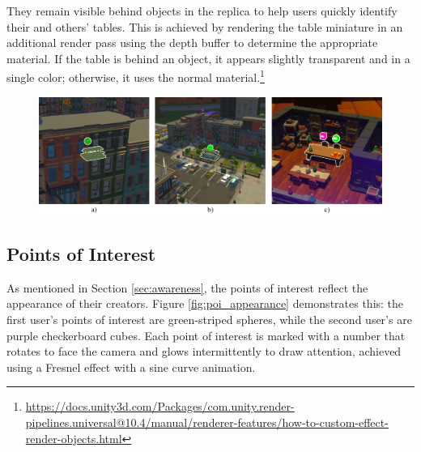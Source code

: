         They remain visible behind objects in the replica to help users quickly identify their and others' tables. This is achieved by rendering the table miniature in an additional render pass using the depth buffer to determine the appropriate material. If the table is behind an object, it appears slightly transparent and in a single color; otherwise, it uses the normal material.\footnote{\url{https://docs.unity3d.com/Packages/com.unity.render-pipelines.universal@10.4/manual/renderer-features/how-to-custom-effect-render-objects.html}}

        \begin{figure}[h!]
            \centering
            \includegraphics[width=1\textwidth]{figures/table_behind.png}
            \label{fig:table_behind}
        \end{figure}


    \subsection{Points of Interest} \label{sec:visual_poi}
        As mentioned in Section \ref{sec:awareness}, the points of interest reflect the appearance of their creators. Figure \ref{fig:poi_appearance} demonstrates this: the first user's points of interest are green-striped spheres, while the second user's are purple checkerboard cubes. Each point of interest is marked with a number that rotates to face the camera and glows intermittently to draw attention, achieved using a Fresnel effect with a sine curve animation.

